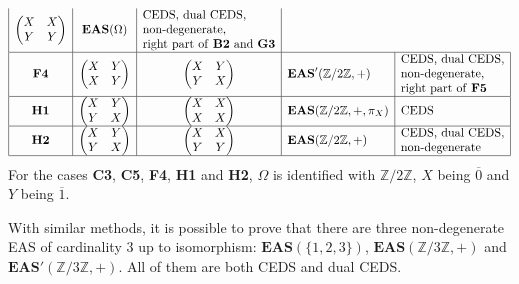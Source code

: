 \documentclass[pdftex]{sigma}
\numberwithin{equation}{section}
\newcommand{\eas}{\mathbf{EAS}}
\begin{document}
$$\begin{array}{|c|c|c|l|l|}
\begin{pmatrix}
X&X\\Y&Y
\end{pmatrix}&\eas(\Omega)&\begin{array}{@{}l@{}}\text{CEDS, dual CEDS},\\
\text{non-degenerate},\\
\text{right part of \textbf{B2} and \textbf{G3}}\end{array}\\
\hline \mathbf{F4}&\begin{pmatrix}
X&Y\\X&Y
\end{pmatrix}&
\begin{pmatrix}
X&Y\\Y&X
\end{pmatrix}&\eas'(\mathbb{Z}/2\mathbb{Z},+)&\begin{array}{@{}l@{}}\text{CEDS, dual CEDS},\\
\text{non-degenerate},\\
\text{right part of \textbf{F5}}\end{array}\\
\hline \mathbf{H1}&\begin{pmatrix}
X&Y\\Y&X
\end{pmatrix}&
\begin{pmatrix}
X&X\\X&X
\end{pmatrix}&\eas(\mathbb{Z}/2\mathbb{Z},+,\pi_X)&\text{CEDS}\\
\hline \mathbf{H2}&\begin{pmatrix}
X&Y\\Y&X
\end{pmatrix}&
\begin{pmatrix}
X&X\\Y&Y
\end{pmatrix}&\eas(\mathbb{Z}/2\mathbb{Z},+)&\begin{array}{@{}l@{}}\text{CEDS, dual CEDS},\\
\text{non-degenerate}\end{array}\\
\hline \end{array}
$$
For the cases \textbf{C3}, \textbf{C5}, \textbf{F4}, \textbf{H1} and \textbf{H2}, $\Omega$ is identified with $\mathbb{Z}/2\mathbb{Z}$, $X$ being $\overline{0}$ and $Y$ being $\overline{1}$.

\begin{Remark}
With similar methods, it is possible to prove that there are three non-degenerate EAS of cardinality 3 up to isomorphism: $\eas(\{1,2,3\})$, $\eas(\mathbb{Z}/3\mathbb{Z},+)$ and $\eas'(\mathbb{Z}/3\mathbb{Z},+)$. All of them are both CEDS and dual CEDS.
\end{Remark}
\end{document}

